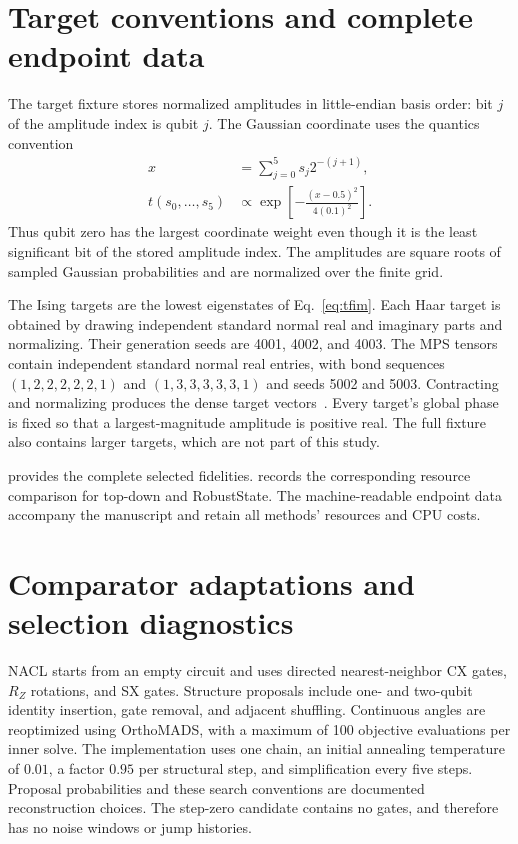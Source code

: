\section{Target conventions and complete endpoint data}
\label{app:targets}

The target fixture stores normalized amplitudes in little-endian basis
order: bit $j$ of the amplitude index is qubit $j$. The Gaussian coordinate
uses the quantics convention
\begin{equation}
\begin{aligned}
 x&=\sum_{j=0}^{5}s_j2^{-(j+1)},\\
 t(s_0,\ldots,s_5)&\propto
 \exp\!\left[-\frac{(x-0.5)^2}{4(0.1)^2}\right].
\end{aligned}
\end{equation}
Thus qubit zero has the largest coordinate weight even though it is the
least significant bit of the stored amplitude index. The amplitudes are
square roots of sampled Gaussian probabilities and are normalized over
the finite grid.

The Ising targets are the lowest eigenstates of Eq.~\eqref{eq:tfim}.
Each Haar target is obtained by drawing independent standard normal real
and imaginary parts and normalizing. Their generation seeds are 4001,
4002, and 4003. The MPS tensors contain independent standard normal real
entries, with bond sequences $(1,2,2,2,2,2,1)$ and $(1,3,3,3,3,3,1)$ and
seeds 5002 and 5003. Contracting and normalizing produces the dense target
vectors~\cite{Schollwock2011}. Every target's global phase is fixed so
that a largest-magnitude amplitude is positive real. The full fixture
also contains larger targets, which are not part of this study.

 provides the complete selected fidelities.
 records the corresponding resource comparison for
top-down and RobustState. The machine-readable endpoint data accompany
the manuscript and retain all methods' resources and CPU costs.




\section{Comparator adaptations and selection diagnostics}
\label{app:comparators}

NACL starts from an empty circuit and uses directed nearest-neighbor
CX gates, $R_Z$ rotations, and SX gates. Structure proposals include
one- and two-qubit identity insertion, gate removal, and adjacent
shuffling. Continuous angles are reoptimized using OrthoMADS, with a
maximum of 100 objective evaluations per inner solve. The implementation
uses one chain, an initial annealing temperature of $0.01$, a factor
$0.95$ per structural step, and simplification every five steps.
Proposal probabilities and these search conventions are documented
reconstruction choices. The step-zero candidate contains no gates,
and therefore has no noise windows or jump histories.

